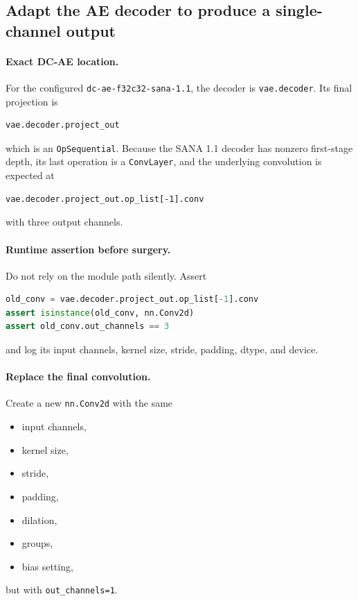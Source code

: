 \documentclass[11pt,a4paper]{article}
\begin{document}
\subsection{Adapt the AE decoder to produce a single-channel output}

\paragraph{Exact DC-AE location.}
For the configured \texttt{dc-ae-f32c32-sana-1.1}, the decoder is \texttt{vae.decoder}. Its final projection is
\begin{lstlisting}
vae.decoder.project_out
\end{lstlisting}
which is an \texttt{OpSequential}. Because the SANA 1.1 decoder has nonzero first-stage depth, its last operation is a \texttt{ConvLayer}, and the underlying convolution is expected at
\begin{lstlisting}
vae.decoder.project_out.op_list[-1].conv
\end{lstlisting}
with three output channels.

\paragraph{Runtime assertion before surgery.}
Do not rely on the module path silently. Assert
\begin{lstlisting}[language=Python]
old_conv = vae.decoder.project_out.op_list[-1].conv
assert isinstance(old_conv, nn.Conv2d)
assert old_conv.out_channels == 3
\end{lstlisting}
and log its input channels, kernel size, stride, padding, dtype, and device.

\paragraph{Replace the final convolution.}
Create a new \texttt{nn.Conv2d} with the same
\begin{itemize}
    \item input channels,
    \item kernel size,
    \item stride,
    \item padding,
    \item dilation,
    \item groups,
    \item bias setting,
\end{itemize}
but with \texttt{out\_channels=1}.
\end{document}
